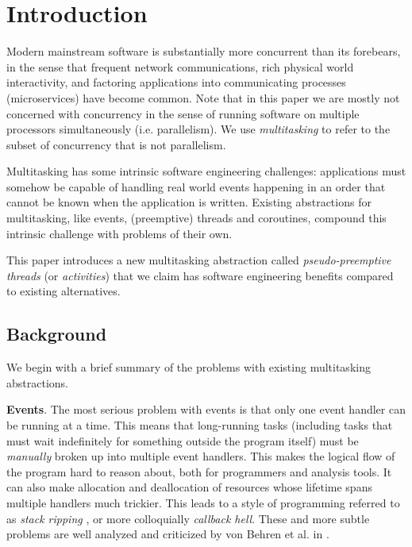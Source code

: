 \documentclass[pldi,10pt,preprint]{sigplanconf-pldi16}
\begin{document}



\section{Introduction}

Modern mainstream software is substantially more concurrent than its forebears, in the sense that frequent network communications, rich physical world interactivity, and factoring applications into communicating processes (microservices) have become common.
Note that in this paper we are mostly not concerned with concurrency in the sense of running software on multiple processors simultaneously (i.e. parallelism).
We use \emph{multitasking} to refer to the subset of concurrency that is not parallelism.

Multitasking has some intrinsic software engineering challenges: applications must somehow be capable of handling real world events happening in an order that cannot be known when the application is written.
Existing abstractions for multitasking, like events, (preemptive) threads and coroutines, compound this intrinsic challenge with problems of their own.

This paper introduces a new multitasking abstraction called \emph{pseudo-preemptive threads} (or \emph{activities}) that we claim has software engineering benefits compared to existing alternatives.

\subsection{Background}

We begin with a brief summary of the problems with existing multitasking abstractions.

\textbf{Events}.
The most serious problem with events is that only one event handler can be running at a time.
This means that long-running tasks (including tasks that must wait indefinitely for something outside the program itself) must be \emph{manually} broken up into multiple event handlers.
This makes the logical flow of the program hard to reason about, both for programmers and analysis tools.
It can also make allocation and deallocation of resources whose lifetime spans multiple handlers much trickier.
This leads to a style of programming referred to as \emph{stack ripping} \cite{Adya2002}, or more colloquially \emph{callback hell}.
These and more subtle problems are well analyzed and criticized by von Behren et al. in \cite{Behren2003a}.
\end{document}
